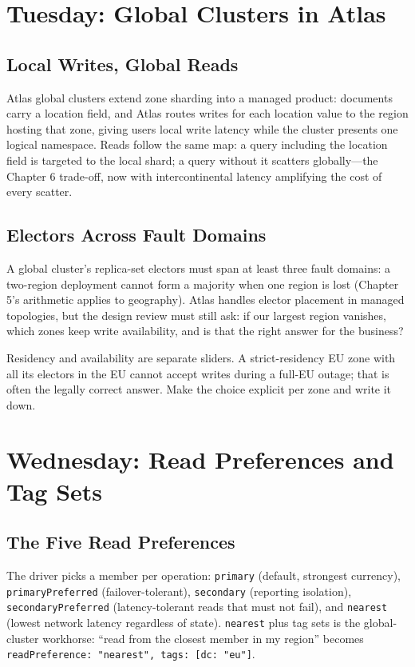 \section{Tuesday: Global Clusters in Atlas}
\subsection{Local Writes, Global Reads}
Atlas global clusters extend zone sharding into a managed product: documents carry a location field, and Atlas routes writes for each location value to the region hosting that zone, giving users local write latency while the cluster presents one logical namespace. Reads follow the same map: a query including the location field is targeted to the local shard; a query without it scatters globally---the Chapter 6 trade-off, now with intercontinental latency amplifying the cost of every scatter.

\subsection{Electors Across Fault Domains}
A global cluster's replica-set electors must span at least three fault domains: a two-region deployment cannot form a majority when one region is lost (Chapter 5's arithmetic applies to geography). Atlas handles elector placement in managed topologies, but the design review must still ask: if our largest region vanishes, which zones keep write availability, and is that the right answer for the business?

\begin{tipbox}
Residency and availability are separate sliders. A strict-residency EU zone with all its electors in the EU cannot accept writes during a full-EU outage; that is often the legally correct answer. Make the choice explicit per zone and write it down.
\end{tipbox}

\section{Wednesday: Read Preferences and Tag Sets}
\subsection{The Five Read Preferences}
The driver picks a member per operation: \texttt{primary} (default, strongest currency), \texttt{primaryPreferred} (failover-tolerant), \texttt{secondary} (reporting isolation), \texttt{secondaryPreferred} (latency-tolerant reads that must not fail), and \texttt{nearest} (lowest network latency regardless of state). \texttt{nearest} plus tag sets is the global-cluster workhorse: ``read from the closest member in my region'' becomes \texttt{readPreference: "nearest", tags: [{dc: "eu"}]}.

